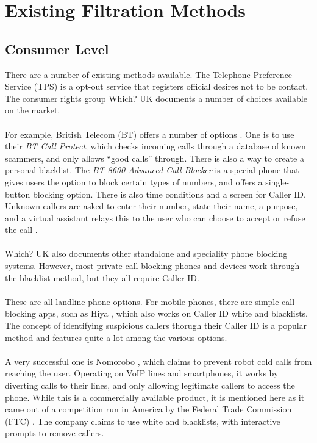 \documentclass[main.tex]{subfiles}
\begin{document}
\section{Existing Filtration Methods}\label{sec:methods}
\subsection{Consumer Level}
There are a number of existing methods available. The Telephone Preference Service (TPS) \cite{tps} is a opt-out service that registers official desires not to be contact. The consumer rights group Which? UK \cite{which-methods} documents a number of choices available on the market.
\\\\
For example, British Telecom (BT) offers a number of options \cite{bt-block}. One is to use their \textit{BT Call Protect}, which checks incoming calls through a database of known scammers, and only allows ``good calls'' through. There is also a way to create a personal blacklist. The \textit{BT 8600 Advanced Call Blocker} is a special phone that gives users the option to block certain types of numbers, and offers a single-button blocking option. There is also time conditions and  a screen for Caller ID. Unknown callers are asked to enter their number, state their name, a purpose, and a virtual assistant relays this to the user who can choose to accept or refuse the call \cite{bt-block}.
\\\\
Which? UK \cite{which-methods} also documents other standalone and speciality phone blocking systems. However, most private call blocking phones and devices work through the blacklist method, but they all require Caller ID.
\\\\
These are all landline phone options. For mobile phones, there are simple call blocking apps, such as Hiya \cite{macworld}, which also works on Caller ID white and blacklists. The concept of identifying suspicious callers thorugh their Caller ID is a popular method and features quite a lot among the various options.
\\\\
A very successful one is Nomorobo \cite{nomorobo}, which claims to prevent robot cold calls from reaching the user. Operating on VoIP lines and smartphones, it works by diverting calls to their lines, and only allowing legitimate callers to access the phone. While this is a commercially available product, it is mentioned here as it came out of a competition run in America by the Federal Trade Commission (FTC) \cite{wired-nomorobo}. The company claims to use white and blacklists, with interactive prompts to remove callers.
\end{document}
